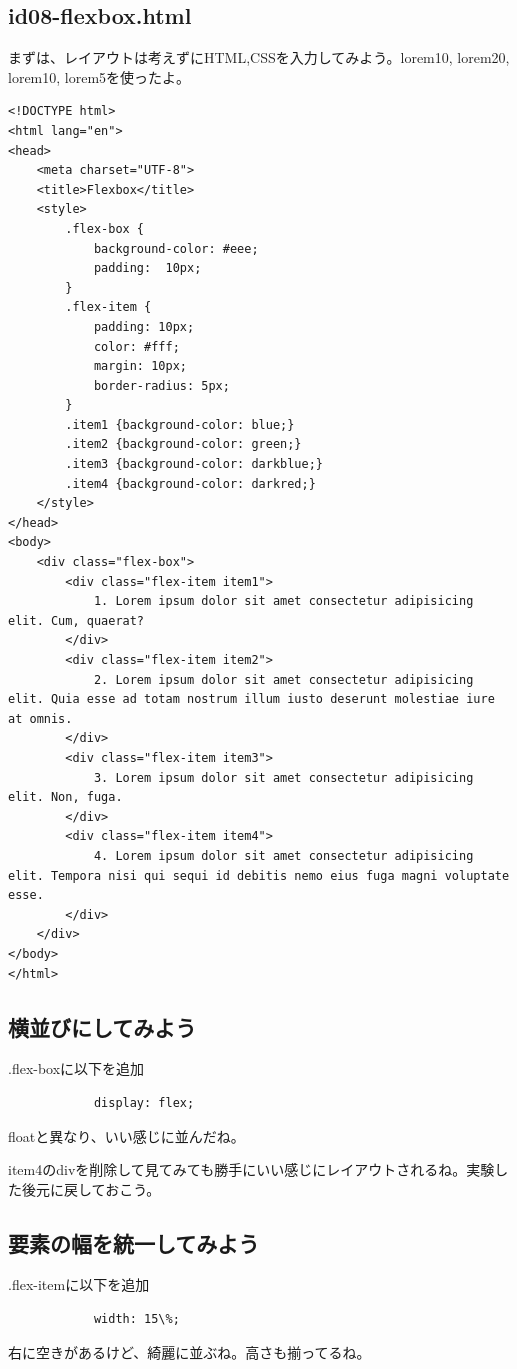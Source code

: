 \documentclass[mingoth,11pt,a4j,uplatex,dvipdfmx]{jsarticle}
\begin{document}
\subsection{id08-flexbox.html}
まずは、レイアウトは考えずにHTML,CSSを入力してみよう。lorem10, lorem20, lorem10, lorem5を使ったよ。
\begin{lstlisting}
<!DOCTYPE html>
<html lang="en">
<head>
    <meta charset="UTF-8">
    <title>Flexbox</title>
    <style>
        .flex-box {
            background-color: #eee;
            padding:  10px;
        }
        .flex-item {
            padding: 10px;
            color: #fff;
            margin: 10px;
            border-radius: 5px;
        }
        .item1 {background-color: blue;}
        .item2 {background-color: green;}
        .item3 {background-color: darkblue;}
        .item4 {background-color: darkred;}
    </style>
</head>
<body>
    <div class="flex-box">
        <div class="flex-item item1">
            1. Lorem ipsum dolor sit amet consectetur adipisicing elit. Cum, quaerat?
        </div>
        <div class="flex-item item2">
            2. Lorem ipsum dolor sit amet consectetur adipisicing elit. Quia esse ad totam nostrum illum iusto deserunt molestiae iure at omnis.
        </div>
        <div class="flex-item item3">
            3. Lorem ipsum dolor sit amet consectetur adipisicing elit. Non, fuga.
        </div>
        <div class="flex-item item4">
            4. Lorem ipsum dolor sit amet consectetur adipisicing elit. Tempora nisi qui sequi id debitis nemo eius fuga magni voluptate esse.
        </div>
    </div>
</body>
</html>
\end{lstlisting}

\subsection{横並びにしてみよう}
.flex-boxに以下を追加
\begin{lstlisting}
            display: flex;
\end{lstlisting}
floatと異なり、いい感じに並んだね。

item4のdivを削除して見てみても勝手にいい感じにレイアウトされるね。実験した後元に戻しておこう。

\subsection{要素の幅を統一してみよう}
.flex-itemに以下を追加
\begin{lstlisting}
            width: 15\%;
\end{lstlisting}
右に空きがあるけど、綺麗に並ぶね。高さも揃ってるね。
\end{document}
